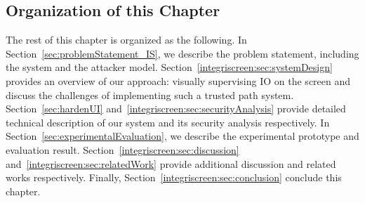 \subsection{Organization of this Chapter}

The rest of this chapter is organized as the following. In Section~\ref{sec:problemStatement_IS}, we describe the problem statement, including the system and the attacker model. Section~\ref{integriscreen:sec:systemDesign} provides an overview of our approach: visually supervising IO on the screen and discuss the challenges of implementing such a trusted path system. Section~\ref{sec:hardenUI} and~\ref{integriscreen:sec:securityAnalysis} provide detailed technical description of our system \integriscreen and its security analysis respectively. In Section~\ref{sec:experimentalEvaluation}, we describe the experimental prototype and evaluation result. Section~\ref{integriscreen:sec:discussion} and~\ref{integriscreen:sec:relatedWork} provide additional discussion and related works respectively. Finally, Section~\ref{integriscreen:sec:conclusion} conclude this chapter. 
